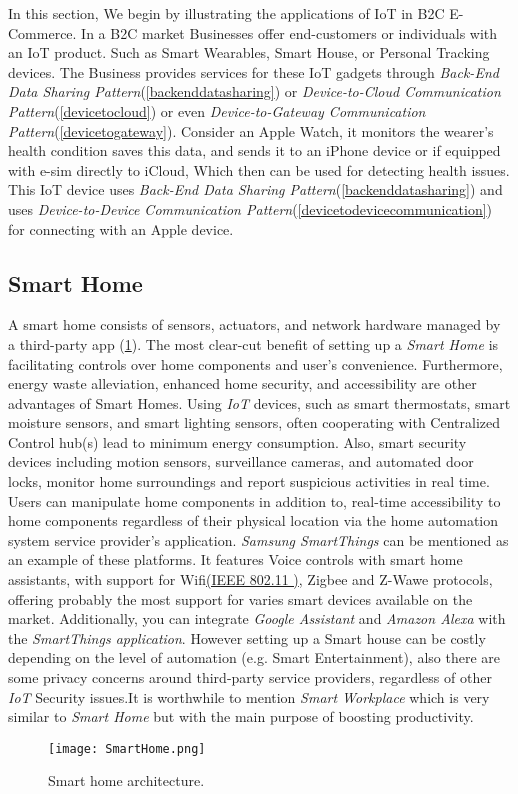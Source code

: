 \documentclass[10pt,journal,compsoc]{IEEEtran}
\begin{document}
	In this section, We begin by illustrating the applications of IoT in B2C E-Commerce.
	In a B2C market Businesses offer end-customers or individuals with an IoT product. Such as Smart Wearables, Smart House, or Personal Tracking devices. The Business provides services for these IoT gadgets through \emph{Back-End Data Sharing Pattern}(\cref{backenddatasharing}) or \emph{Device-to-Cloud Communication Pattern}(\cref{devicetocloud}) or even \emph{Device-to-Gateway Communication Pattern}(\cref{devicetogateway}).
	Consider an Apple Watch, it monitors the wearer's health condition saves this data, and sends it to an iPhone device or if equipped with e-sim directly to iCloud, Which then can be used for detecting health issues. This IoT device uses \emph{Back-End Data Sharing Pattern}(\cref{backenddatasharing}) and uses \emph{Device-to-Device Communication Pattern}(\cref{devicetodevicecommunication}) for connecting with an Apple device.
	\subsection{Smart Home}
	A smart home consists of sensors, actuators,
	and network hardware managed by a third-party app (\cref{smarthomepic}). The most clear-cut benefit of setting up a \emph{Smart Home} is facilitating controls over home components and user's convenience.
	Furthermore, energy waste alleviation, enhanced home security, and accessibility are other advantages of Smart Homes. Using \emph{IoT} devices, such as
	smart thermostats, smart moisture sensors, and smart lighting sensors, often cooperating with Centralized Control hub(s) lead to minimum energy consumption. Also, smart security devices including motion sensors, surveillance cameras, and automated door locks, monitor home surroundings and report suspicious activities in real time. Users can manipulate home components in addition to, real-time accessibility to home components regardless of their physical location via the home automation system service provider's application. \emph{Samsung SmartThings} can be mentioned as an example of these platforms. It features Voice controls with smart home assistants, with support for Wifi\href{https://datatracker.ietf.org/doc/html/rfc7494}{(IEEE 802.11 )}, Zigbee and Z-Wawe protocols, offering probably the most support for varies smart devices available on the market. Additionally, you can integrate \emph{Google Assistant} and \emph{Amazon Alexa} with the \emph{SmartThings application}. However setting up a Smart house can be costly depending on the level of automation (e.g. Smart Entertainment), also there are some privacy concerns around third-party service providers, regardless of other \emph{IoT} Security issues.It is worthwhile to mention \emph{Smart Workplace} which is very similar to \emph{Smart Home} but with the main purpose of boosting productivity.
	\begin{figure}[h]
		\texttt{[image: SmartHome.png]}
		\caption{Smart home architecture.\cite{smarthomearch}}
		\label{smarthomepic}
	\end{figure}
\end{document}
